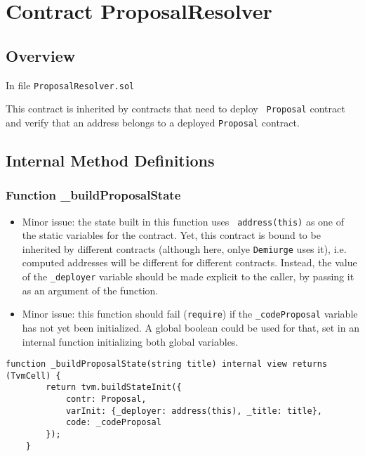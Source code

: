 
\chapter{Contract ProposalResolver}

\minitoc

\section{Overview}

In file {\tt ProposalResolver.sol}

This contract is inherited by contracts that need to deploy {\tt
  Proposal} contract and verify that an address belongs to a deployed
{\tt Proposal} contract.

\section{Internal Method Definitions}


\subsection{Function \_{}buildProposalState}

\begin{itemize}
\item Minor issue: the state built in this function uses {\tt
  address(this)} as one of the static variables for the contract. Yet,
  this contract is bound to be inherited by different contracts
  (although here, onlye {\tt Demiurge} uses it), i.e. computed
  addresses will be different for different contracts. Instead, the
  value of the {\tt \_deployer} variable should be made explicit to
  the caller, by passing it as an argument of the function.
\item Minor issue: this function should fail ({\tt require}) if the
  {\tt \_codeProposal} variable has not yet been initialized. A global
  boolean could be used for that, set in an internal function
  initializing both global variables.
\end{itemize}

\begin{lstlisting}[firstnumber=14]
    function _buildProposalState(string title) internal view returns (TvmCell) {
        return tvm.buildStateInit({
            contr: Proposal,
            varInit: {_deployer: address(this), _title: title},
            code: _codeProposal
        });
    }
\end{lstlisting}
